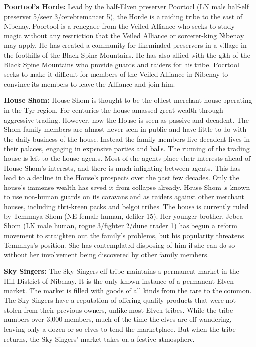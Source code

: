 {
	\textbf{Poortool's Horde:} Lead by the half-Elven preserver Poortool (LN male half-elf preserver 5/seer 3/cerebremancer 5), the Horde is a raiding tribe to the east of Nibenay. Poortool is a renegade from the Veiled Alliance who seeks to study magic without any restriction that the Veiled Alliance or sorcerer-king Nibenay may apply. He has created a community for likeminded preservers in a village in the foothills of the Black Spine Mountains. He has also allied with the gith of the Black Spine Mountains who provide guards and raiders for his tribe. Poortool seeks to make it difficult for members of the Veiled Alliance in Nibenay to convince its members to leave the Alliance and join him.

	\textbf{House Shom:} House Shom is thought to be the oldest merchant house operating in the Tyr region. For centuries the house amassed great wealth through aggressive trading. However, now the House is seen as passive and decadent. The Shom family members are almost never seen in public and have little to do with the daily business of the house. Instead the family members live decadent lives in their palaces, engaging in expensive parties and balls. The running of the trading house is left to the house agents. Most of the agents place their interests ahead of House Shom's interests, and there is much infighting between agents. This has lead to a decline in the House's prospects over the past few decades. Only the house's immense wealth has saved it from collapse already. House Shom is known to use non-human guards on its caravans and as raiders against other merchant houses, including thri-kreen packs and belgoi tribes. The house is currently ruled by Temmnya Shom (NE female human, defiler 15). Her younger brother, Jebea Shom (LN male human, rogue 3/fighter 2/dune trader 1) has begun a reform movement to straighten out the family's problems, but his popularity threatens Temmnya's position. She has contemplated disposing of him if she can do so without her involvement being discovered by other family members.

	\textbf{Sky Singers:} The Sky Singers elf tribe maintains a permanent market in the Hill District of Nibenay. It is the only known instance of a permanent Elven market. The market is filled with goods of all kinds from the rare to the common. The Sky Singers have a reputation of offering quality products that were not stolen from their previous owners, unlike most Elven tribes. While the tribe numbers over 3,000 members, much of the time the elves are off wandering, leaving only a dozen or so elves to tend the marketplace. But when the tribe returns, the Sky Singers' market takes on a festive atmosphere.

}
